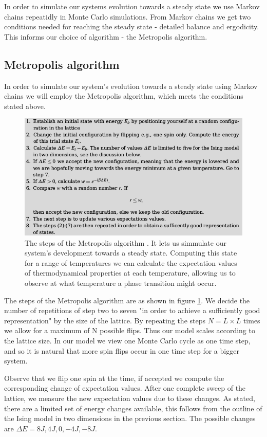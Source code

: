 \documentclass[norsk, 10pt, twocolumn, a4paper]{revtex4}
\begin{document}
In order to simulate our systems evolution towards a steady state we use Markov chains
repeatidly in Monte Carlo simulations. From Markov chains we get two conditions needed
for reaching the steady state - detailed balance and ergodicity. This informs our
choice of algorithm - the Metropolis algorithm.

\subsection{Metropolis algorithm}
In order to simulate our system's evolution towards a steady state using Markov chains
we will employ the Metropolis algorithm, which meets the conditions stated above.

\begin{figure}
    \includegraphics[width=0.9\linewidth]{metro.png}
    \caption{
        \label{fig:metro}
    The steps of the Metropolis algorithm \cite{komp}. It lets us simmulate our system's development towards
    a steady state. Computing this state for a range of temperatures we can calculate the expectation values of
    thermodynamical properties at each temperature, allowing us to observe at what temperature a phase transition might
    occur.}
\end{figure}

The steps of the Metropolis algorithm \cite{komp} are as shown in figure \ref{fig:metro}.
We decide the number of repetitions of step two to seven "in order to achieve a sufficiently good representation"
by the size of the lattice. By repeating the steps $N=L\times L$ times we allow for a maximum of N possible flips.
Thus our model scales according to the lattice size. In our model we view one Monte Carlo cycle as one time step,
and so it is natural that more spin flips occur in one time step for a bigger system.

Observe that we flip one spin at the time, if accepted we compute the corresponding change of expectation values.
After one complete sweep of the lattice, we measure the new expectation values due to these changes.
As stated, there are a limited set of energy changes available, this follows from the outline of the Ising model
in two dimensions in the previous section. The possible changes are $\Delta E=8J, 4J, 0, -4J, -8J$.
\end{document}

